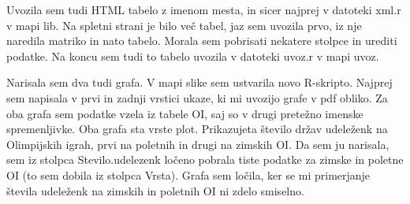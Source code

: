 \documentclass[11pt,a4paper]{article}
\begin{document}
Uvozila sem tudi HTML tabelo z imenom mesta, in sicer najprej v datoteki xml.r v mapi lib. Na spletni strani je bilo več tabel, jaz sem uvozila prvo, iz nje naredila matriko in nato tabelo. Morala sem pobrisati nekatere stolpce in urediti podatke. Na koncu sem tudi to tabelo uvozila v datoteki uvoz.r v mapi uvoz.

Narisala sem dva tudi grafa. V mapi slike sem ustvarila novo R-skripto. Najprej sem napisala v prvi in zadnji vrstici ukaze, ki mi uvozijo grafe v pdf obliko. Za oba grafa sem podatke vzela iz tabele OI, saj so v drugi pretežno imenske spremenljivke.
Oba grafa sta vrste plot. Prikazujeta število držav udeleženk na Olimpijskih igrah, prvi na poletnih in drugi na zimskih OI. Da sem ju narisala, sem iz stolpca Stevilo.udelezenk ločeno pobrala tiste podatke za zimske in poletne OI (to sem dobila iz stolpca Vrsta). Grafa sem ločila, ker se mi primerjanje števila udeleženk na zimskih in poletnih OI ni zdelo smiselno.
 



% 
% 
% 
\end{document}
